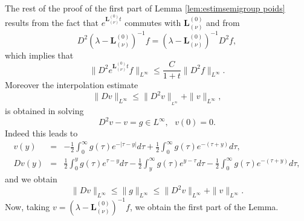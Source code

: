 \documentclass[11pt]{article}
\begin{document}
The rest of the proof of the first part of Lemma \ref{lem:estimsemigroup
poids} results from the fact that $e^{\boldsymbol{L}_{(\nu )}^{(0)}t}$
commutes with $\boldsymbol{L}_{(\nu )}^{(0)}$ and from%
\begin{equation*}
D^{2}(\lambda -\boldsymbol{L}_{(\nu )}^{(0)})^{-1}f=(\lambda -\boldsymbol{L}%
_{(\nu )}^{(0)})^{-1}D^{2}f,
\end{equation*}%
which implies that
\begin{equation*}
\|D^{2}e^{\boldsymbol{L}_{(\nu )}^{(0)}t}f\|_{L^{\infty }}\leq \frac{C}{1+t}%
\|D^{2}f\|_{L^{\infty }}.
\end{equation*}%
Moreover the interpolation estimate 
\begin{equation*}
\|Dv\|_{L^{\infty }}\leq \|D^{2}v\|_{_{L^{\infty }}}+\|v\|_{L^{\infty }},
\end{equation*}%
is obtained in solving%
\begin{equation*}
D^{2}v-v=g\in L^{\infty },\text{ }v(0)=0.
\end{equation*}%
Indeed this leads to%
\begin{eqnarray*}
v(y) &=&-\frac{1}{2}\int_{0}^{\infty }g(\tau )e^{-|\tau -y|}d\tau +\frac{1}{2%
}\int_{0}^{\infty }g(\tau )e^{-(\tau +y)}d\tau , \\
Dv(y) &=&\frac{1}{2}\int_{0}^{y}g(\tau )e^{\tau -y}d\tau -\frac{1}{2}%
\int_{y}^{\infty }g(\tau )e^{y-\tau }d\tau -\frac{1}{2}\int_{0}^{\infty
}g(\tau )e^{-(\tau +y)}d\tau ,
\end{eqnarray*}%
and we obtain 
\begin{equation*}
\|Dv\|_{L^{\infty }}\leq \|g\|_{L^{\infty }}\leq \|D^{2}v\|_{L^{\infty
}}+\|v\|_{L^{\infty }}.
\end{equation*}%
Now, taking $v=(\lambda -\boldsymbol{L}_{(\nu )}^{(0)})^{-1}f$, we obtain the first part of the Lemma.
\end{document}
